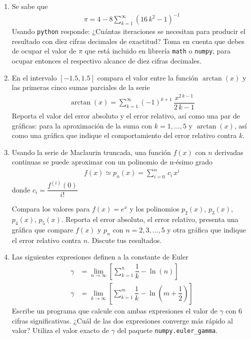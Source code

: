 \documentclass[11pt]{article}
\newcommand{\python}{\texttt{python}}
\begin{document}
\begin{enumerate}
\item Se sabe que
\begin{align*}
\pi = 4 - 8 \sum_{k=1}^{\infty} \left( 16 \, k^{2} - 1 \right)^{-1}
\end{align*}
Usando \python{} responde: ¿Cuántas iteraciones se necesitan para producir el resultado con diez cifras decimales de exactitud? Toma en cuenta que debes de ocupar el valor de $\pi$ que está incluido en librería \texttt{math} o \texttt{numpy}, para ocupar entonces el respectivo alcance de diez cifras decimales.
\item En el intervalo $[-1.5, 1.5]$ compara el valor entre la función $\arctan(x)$ y las primeras cinco sumas parciales de la serie
\begin{align*}
\arctan(x) = \sum_{k=1}^{\infty} (-1)^{k+1} \, \dfrac{x^{2 \, k - 1}}{2\, k - 1}
\end{align*}
Reporta el valor del error absoluto y el error relativo, así como una par de gráficas: para la aproximación de la suma con $k = 1, \ldots, 5$ y $\arctan(x)$, así como una gráfica que indique el comportamiento del error relativo contra $k$.
\item Usando la serie de Maclaurin truncada, una función $f(x)$ con $n$ derivadas continuas se puede aproximar con un polinomio de n-ésimo grado
\begin{align*}
f(x) \simeq p_{n}(x) = \sum_{i=0}^{n} \, c_{i} \, x^{i}
\end{align*}
donde $c_{i} = \dfrac{f^{(i)}(0)}{i!}$

Compara los valores para $f(x)= e^{x}$ y los polinomios $p_{2}(x)$, $p_{3}(x)$, $p_{4}(x)$, $p_{5}(x)$. Reporta el error absoluto, el error relativo, presenta una gráfica que compare $f(x)$ y $p_{n}$ con $n = 2, 3, \ldots, 5$ y otra gráfica que indique el error relativo contra $n$. Discute tus resultados.
\item Las siguientes expresiones definen a la constante de Euler
\begin{align}
\gamma &= \lim_{n \to \infty} \left[ \sum_{k=1}^{n} \dfrac{1}{k} - \ln (n) \right] \\[0.5em]
\gamma &= \lim_{k \to \infty} \left[ \sum_{k=1}^{m} \dfrac{1}{k} - \ln \left( m + \dfrac{1}{2} \right) \right]
\end{align}
Escribe un programa que calcule con ambas expresiones el valor de $\gamma$ con 6 cifras significativas. ¿Cuál de las dos expresiones converge más rápido al valor? Utiliza el valor exacto de $\gamma$ del paquete \texttt{numpy.euler\_gamma}.
\end{enumerate}
\end{document}
